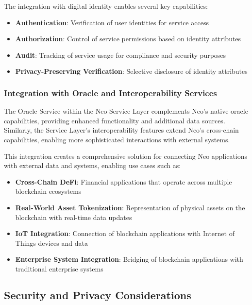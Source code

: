 The integration with digital identity enables several key capabilities:

\begin{itemize}
    \item \textbf{Authentication}: Verification of user identities for service access
    \item \textbf{Authorization}: Control of service permissions based on identity attributes
    \item \textbf{Audit}: Tracking of service usage for compliance and security purposes
    \item \textbf{Privacy-Preserving Verification}: Selective disclosure of identity attributes
\end{itemize}

\subsubsection{Integration with Oracle and Interoperability Services}
\label{subsubsec:oracle-interop-integration}

The Oracle Service within the Neo Service Layer complements Neo's native oracle capabilities, providing enhanced functionality and additional data sources. Similarly, the Service Layer's interoperability features extend Neo's cross-chain capabilities, enabling more sophisticated interactions with external systems.

This integration creates a comprehensive solution for connecting Neo applications with external data and systems, enabling use cases such as:

\begin{itemize}
    \item \textbf{Cross-Chain DeFi}: Financial applications that operate across multiple blockchain ecosystems
    \item \textbf{Real-World Asset Tokenization}: Representation of physical assets on the blockchain with real-time data updates
    \item \textbf{IoT Integration}: Connection of blockchain applications with Internet of Things devices and data
    \item \textbf{Enterprise System Integration}: Bridging of blockchain applications with traditional enterprise systems
\end{itemize}

\subsection{Security and Privacy Considerations}
\label{subsec:nsl-security}

